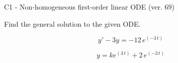 \begin{exercise}
  \begin{exerciseTitle}C1 - Non-homogeneous first-order linear ODE (ver. 69)\end{exerciseTitle}
  \begin{exerciseStatement}
    
Find the general solution to the given ODE.

    
\[y'-3y= -12 \, e^{\left(-3 \, t\right)}\]

  \end{exerciseStatement}
  \begin{exerciseAnswer}
    
\[y= k e^{\left(3 \, t\right)} + 2 \, e^{\left(-3 \, t\right)}\]

  \end{exerciseAnswer}
\end{exercise}